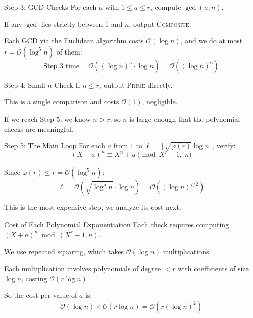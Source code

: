 \documentclass{beamer}
\begin{document}

\begin{frame}{Step 3: GCD Checks}
For each $a$ with $1 \le a \le r$, compute $\gcd(a, n)$.

If any $\gcd$ lies strictly between $1$ and $n$, output \textsc{Composite}.

Each GCD via the Euclidean algorithm costs $\mathcal{O}(\log n)$,
and we do at most $r = \mathcal{O}(\log^5 n)$ of them:
\[
    \text{Step 3 time} = \mathcal{O}((\log n)^5 \cdot \log n) = \mathcal{O}((\log n)^6)
\]
\end{frame}


\begin{frame}{Step 4: Small $n$ Check}
If $n \le r$, output \textsc{Prime} directly.

This is a single comparison and costs $\mathcal{O}(1)$, negligible.

If we reach Step 5, we know $n > r$, so $n$ is large enough
that the polynomial checks are meaningful.
\end{frame}


\begin{frame}{Step 5: The Main Loop}
For each $a$ from $1$ to $\ell = \lfloor\sqrt{\varphi(r)}\log n\rfloor$, verify:
\[
    (X + a)^n \equiv X^n + a \pmod{X^r - 1,\; n}
\]

Since $\varphi(r) \le r = \mathcal{O}(\log^5 n)$:
\[
    \ell = \mathcal{O}\!\left(\sqrt{\log^5 n} \cdot \log n\right) = \mathcal{O}((\log n)^{7/2})
\]

This is the most expensive step, we analyze its cost next.
\end{frame}


\begin{frame}{Cost of Each Polynomial Exponentiation}
Each check requires computing $(X+a)^n \bmod (X^r - 1, n)$.

We use repeated squaring, which takes $\mathcal{O}(\log n)$ multiplications.

Each multiplication involves polynomials of degree $< r$ with
coefficients of size $\log n$, costing $\mathcal{O}(r \log n)$.

So the cost per value of $a$ is:
\[
    \mathcal{O}(\log n) \times \mathcal{O}(r \log n) = \mathcal{O}(r (\log n)^2)
\]
\end{frame}
\end{document}
